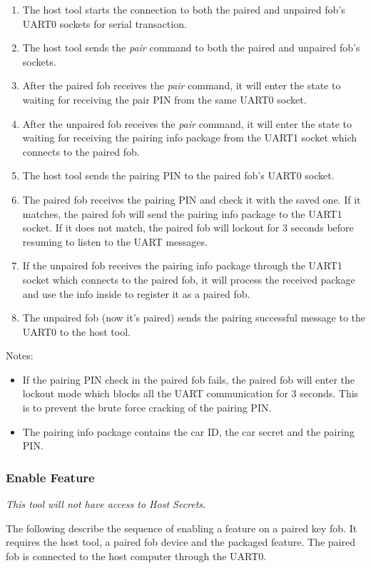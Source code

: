 \documentclass[11pt,oneside,onecolumn,letterpaper]{article}
\begin{document}
\begin{enumerate}
	\item The host tool starts the connection to both the paired and unpaired fob's UART0 sockets for serial transaction.
	\item The host tool sends the \textit{pair} command to both the paired and unpaired fob's sockets.
	\item After the paired fob receives the \textit{pair} command, it will enter the state to waiting for receiving the pair PIN from the same UART0 socket.
	\item After the unpaired fob receives the \textit{pair} command, it will enter the state to waiting for receiving the pairing info package from the UART1 socket which connects to the paired fob.
	\item The host tool sends the pairing PIN to the paired fob's UART0 socket.
	\item The paired fob receives the pairing PIN and check it with the saved one. If it matches, the paired fob will send the pairing info package to the UART1 socket. If it does not match, the paired fob will lockout for 3 seconds before resuming to listen to the UART messages.
	\item If the unpaired fob receives the pairing info package through the UART1 socket which connects to the paired fob, it will process the received package and use the info inside to register it as a paired fob. 
	\item The unpaired fob (now it's paired) sends the pairing successful message to the UART0 to the host tool.
\end{enumerate}

Notes:
\begin{itemize}
	\item If the pairing PIN check in the paired fob fails, the paired fob will enter the lockout mode which blocks all the UART communication for 3 seconds. This is to prevent the brute force cracking of the pairing PIN.
	\item The pairing info package contains the car ID, the car secret and the pairing PIN.
\end{itemize}

\subsubsection{Enable Feature}

\textit{This tool will not have access to Host Secrets.}

The following describe the sequence of enabling a feature on a paired key fob. It requires the host tool, a paired fob device and the packaged feature. The paired fob is connected to the host computer through the UART0.
\end{document}
